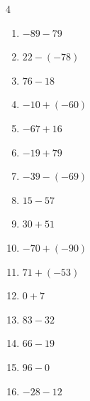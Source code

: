 \begin{multicols}{4}
\begin{enumerate}
        \phantom{$=-2$}

  \item $-89-79$

        \phantom{$=-168$}

  \item $22-(-78)$

        \phantom{$=100$}

  \item $76-18$

        \phantom{$=58$}

  \item $-10+(-60)$

        \phantom{$=-70$}

  \item $-67+16$

        \phantom{$=-51$}

  \item $-19+79$

        \phantom{$=60$}

  \item $-39-(-69)$

        \phantom{$=30$}

  \item $15-57$

        \phantom{$=-42$}

  \item $30+51$

        \phantom{$=81$}

  \item $-70+(-90)$

        \phantom{$=-160$}

  \item $71+(-53)$

        \phantom{$=18$}

  \item $0+7$

        \phantom{$=7$}

  \item $83-32$

        \phantom{$=51$}

  \item $66-19$

        \phantom{$=47$}

  \item $96-0$

        \phantom{$=96$}

  \item $-28-12$


\end{enumerate}
\end{multicols}
